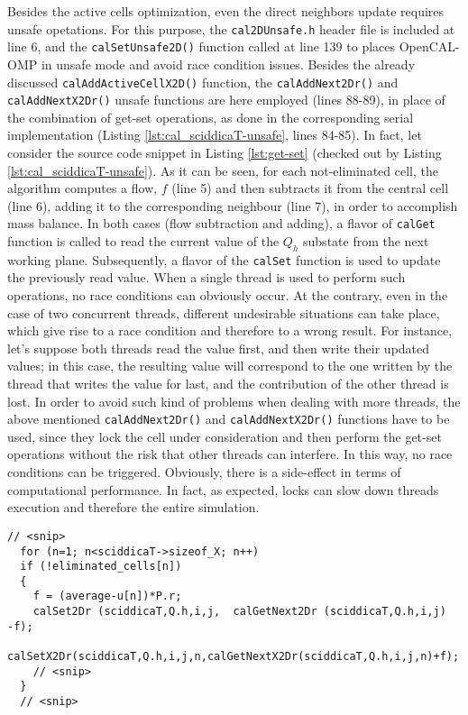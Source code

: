 Besides the active cells optimization, even the direct neighbors
update requires unsafe opetations. For this purpose, the
\verb'cal2DUnsafe.h' header file is included at line 6, and the
\verb'calSetUnsafe2D()' function called at line 139 to places
OpenCAL-OMP in unsafe mode and avoid race condition issues. Besides
the already discussed \verb'calAddActiveCellX2D()' function, the
\verb'calAddNext2Dr()' and \verb'calAddNextX2Dr()' unsafe functions
are here employed (lines 88-89), in place of the combination of
get-set operations, as done in the corresponding serial implementation
(Listing \ref{lst:cal_sciddicaT-unsafe}, lines 84-85). In fact, let
consider the source code snippet in Listing \ref{lst:get-set} (checked
out by Listing \ref{lst:cal_sciddicaT-unsafe}). As it can be seen, for
each not-eliminated cell, the algorithm computes a flow, $f$ (line 5)
and then subtracts it from the central cell (line 6), adding it to the
corresponding neighbour (line 7), in order to accomplish mass
balance. In both cases (flow subtraction and adding), a flavor of
\verb'calGet' function is called to read the current value of the
$Q_h$ substate from the next working plane. Subsequently, a flavor of
the \verb'calSet' function is used to update the previously read
value. When a single thread is used to perform such operations, no
race conditions can obviously occur. At the contrary, even in the case
of two concurrent threads, different undesirable situations can take
place, which give rise to a race condition and therefore to a wrong
result. For instance, let's suppose both threads read the value first,
and then write their updated values; in this case, the resulting value
will correspond to the one written by the thread that writes the value
for last, and the contribution of the other thread is lost. In order
to avoid such kind of problems when dealing with more threads, the
above mentioned \verb'calAddNext2Dr()' and \verb'calAddNextX2Dr()'
functions have to be used, since they lock the cell under
consideration and then perform the get-set operations without the risk
that other threads can interfere. In this way, no race conditions can
be triggered. Obviously, there is a side-effect in terms of
computational performance. In fact, as expected, locks can slow down
threads execution and therefore the entire simulation.

\begin{lstlisting}[float,floatplacement=H, label=lst:get-set, caption=Example of non atomic operation made of a combination of get-set calls.]
  // <snip>
  for (n=1; n<sciddicaT->sizeof_X; n++)
  if (!eliminated_cells[n])
  {
    f = (average-u[n])*P.r;
    calSet2Dr (sciddicaT,Q.h,i,j,  calGetNext2Dr (sciddicaT,Q.h,i,j)  -f);
    calSetX2Dr(sciddicaT,Q.h,i,j,n,calGetNextX2Dr(sciddicaT,Q.h,i,j,n)+f);
    // <snip>
  }
  // <snip>
\end{lstlisting}


